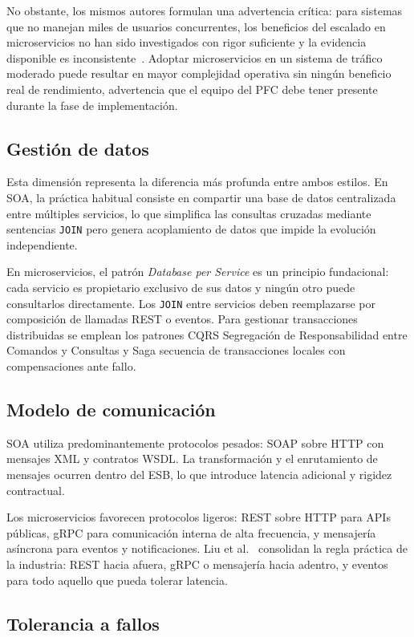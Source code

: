 \documentclass[12pt, a4paper]{article}
\begin{document}
No obstante, los mismos autores formulan una advertencia crítica: para sistemas
que no manejan miles de usuarios concurrentes, los beneficios del escalado en
microservicios no han sido investigados con rigor suficiente y la evidencia
disponible es inconsistente~\cite{blinowski2022}. Adoptar microservicios en un
sistema de tráfico moderado puede resultar en mayor complejidad operativa sin
ningún beneficio real de rendimiento, advertencia que el equipo del PFC debe
tener presente durante la fase de implementación.

\subsection{Gestión de datos}

Esta dimensión representa la diferencia más profunda entre ambos estilos. En SOA,
la práctica habitual consiste en compartir una base de datos centralizada entre
múltiples servicios, lo que simplifica las consultas cruzadas mediante sentencias
\texttt{JOIN} pero genera acoplamiento de datos que impide la evolución independiente.

En microservicios, el patrón \textit{Database per Service} es un principio
fundacional: cada servicio es propietario exclusivo de sus datos y ningún otro
puede consultarlos directamente. Los \texttt{JOIN} entre servicios deben
reemplazarse por composición de llamadas REST o eventos. Para gestionar
transacciones distribuidas se emplean los patrones CQRS Segregación de
Responsabilidad entre Comandos y Consultas y Saga secuencia de transacciones
locales con compensaciones ante fallo.

\subsection{Modelo de comunicación}

SOA utiliza predominantemente protocolos pesados: SOAP sobre HTTP con mensajes XML
y contratos WSDL. La transformación y el enrutamiento de mensajes ocurren dentro
del ESB, lo que introduce latencia adicional y rigidez contractual.

Los microservicios favorecen protocolos ligeros: REST sobre HTTP para APIs públicas,
gRPC para comunicación interna de alta frecuencia, y mensajería asíncrona para
eventos y notificaciones. Liu et al.~\cite{liu2020} consolidan la regla práctica
de la industria: REST hacia afuera, gRPC o mensajería hacia adentro, y eventos
para todo aquello que pueda tolerar latencia.
\newpage
\subsection{Tolerancia a fallos}
\end{document}

